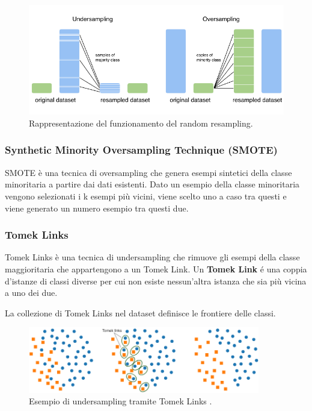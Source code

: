 \begin{figure}[ht]
  \centering
  \includegraphics[width=\textwidth]{images/resampling.png}
  \caption{Rappresentazione del funzionamento del random resampling.}
\end{figure}

\subsubsection*{Synthetic Minority Oversampling Technique (SMOTE)}
SMOTE è una tecnica di oversampling che genera esempi sintetici della classe minoritaria a partire dai dati esistenti.
Dato un esempio della classe minoritaria vengono selezionati i k esempi più vicini, viene scelto uno a caso tra questi e
viene generato un numero esempio tra questi due.

\subsubsection*{Tomek Links}
Tomek Links è una tecnica di undersampling che rimuove gli esempi della classe maggioritaria che appartengono a un Tomek Link.
Un \textbf{Tomek Link} é una coppia d'istanze di classi diverse per cui non esiste nessun'altra istanza che sia più vicina 
a uno dei due.

La collezione di Tomek Links nel dataset definisce le frontiere delle classi.
\begin{figure}[ht]
  \centering
  \includegraphics[width=0.9\textwidth]{images/tomeklinks.png}
  \caption{Esempio di undersampling tramite Tomek Links \cite{web:TomekLinks}.}
\end{figure}

